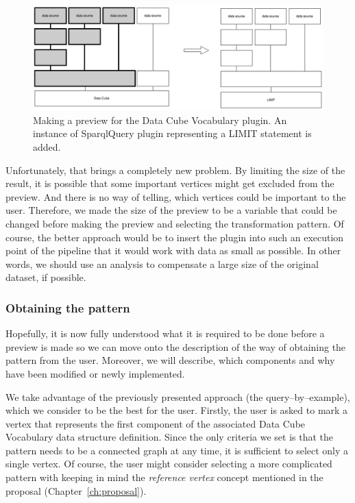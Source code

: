 \begin{figure}
	\centering
	\includegraphics[width=140mm]{img/dcv-extraction-limit.png}
	\caption{Making a preview for the Data Cube Vocabulary plugin. An instance of
	SparqlQuery plugin representing a LIMIT statement is added.}
	\label{fig:dcv-extraction-limit}
\end{figure}

Unfortunately, that brings a completely new problem. By limiting the size of 
the result, it is possible that some important vertices might get excluded from the preview.
And there is no way of 
telling, which vertices could be important to the user. Therefore, we made the 
size of the preview to be a variable that could be changed before making the preview and 
selecting the transformation pattern. Of course, the better approach would be to 
insert the plugin into such an execution point of the pipeline that it would 
work with data as small as possible. In other words, we should use an analysis 
to compensate a large size of the original dataset, if possible.



\subsubsection{Obtaining the pattern}
Hopefully, it is now fully understood what it is required to be done before a preview 
is made so we can move onto the description of the way of obtaining the pattern 
from the user. Moreover, we will describe, which components and why have been 
modified or newly implemented.

\begin{sloppypar}
We take advantage of the previously presented approach (the query--by--example), which we 
consider to be the best for the user. Firstly, the user is asked to mark a vertex that represents
the first component of the associated Data Cube Vocabulary data structure 
definition. Since the only criteria we set is that the pattern needs to be a 
connected graph at any time, it is sufficient to select only a single vertex.
Of course, the user might consider selecting a more complicated pattern with keeping in mind the 
\emph{reference vertex} concept mentioned in the proposal (Chapter~\ref{ch:proposal}).
\end{sloppypar}

